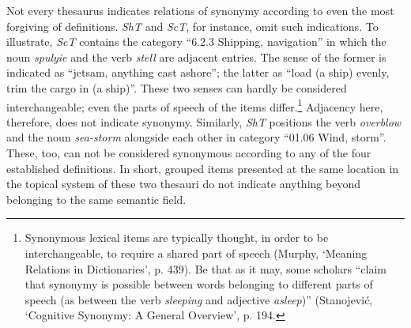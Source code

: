 Not every thesaurus indicates relations of synonymy according to even the most forgiving of definitions. \textit{ShT} and \textit{ScT}, for instance, omit such indications. To illustrate, \textit{ScT} contains the category ``6.2.3 Shipping, navigation'' in which the noun \textit{spulyie} and the verb \textit{stell} are adjacent entries. The sense of the former is indicated as ``jetsam, anything cast ashore''; the latter as ``load (a ship) evenly, trim the cargo in (a ship)''. These two senses can hardly be considered interchangeable; even the parts of speech of the items differ.\footnote{Synonymous lexical items are typically thought, in order to be interchangeable, to require a shared part of speech (Murphy, `Meaning Relations in Dictionaries', p. 439). Be that as it may, some scholars ``claim that synonymy is possible between words belonging to different parts of speech (as between the verb \textit{sleeping} and adjective \textit{asleep})'' (Stanojević, `Cognitive Synonymy: A General Overview', %
p. 194.} Adjacency here, therefore, does not indicate synonymy. Similarly, \textit{ShT} positions the verb \textit{overblow} and the noun \textit{sea-storm} alongside each other in category ``01.06 Wind, storm''. These, too, can not be considered synonymous according to any of the four established definitions. In short, grouped items presented at the same location in the topical system of these two thesauri do not indicate anything beyond belonging to the same semantic field.

